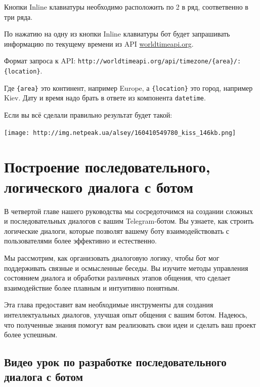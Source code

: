 \documentclass[
]{book}
\begin{document}
Кнопки Inline клавиатуры необходимо расположить по 2 в ряд, соответвенно в три ряда.

По нажатию на одну из кнопки Inline клавиатуры бот будет запрашивать информацию по текущему времени из API \href{http://worldtimeapi.org/}{worldtimeapi.org}.

Формат запроса к API: \texttt{http://worldtimeapi.org/api/timezone/\{area\}/:\{location\}}.

Где \texttt{\{area\}} это континент, например Europe, а \texttt{\{location\}} это город, например Kiev. Дату и время надо брать в ответе из компонента \texttt{datetime}.

Если вы всё сделали правильно результат будет такой:

\texttt{[image: http://img.netpeak.ua/alsey/160410549780\_kiss\_146kb.png]}

\chapter{Построение последовательного, логического диалога с ботом}\label{ux43fux43eux441ux442ux440ux43eux435ux43dux438ux435-ux43fux43eux441ux43bux435ux434ux43eux432ux430ux442ux435ux43bux44cux43dux43eux433ux43e-ux43bux43eux433ux438ux447ux435ux441ux43aux43eux433ux43e-ux434ux438ux430ux43bux43eux433ux430-ux441-ux431ux43eux442ux43eux43c}

В четвертой главе нашего руководства мы сосредоточимся на создании сложных и последовательных диалогов с вашим Telegram-ботом. Вы узнаете, как строить логические диалоги, которые позволят вашему боту взаимодействовать с пользователями более эффективно и естественно.

Мы рассмотрим, как организовать диалоговую логику, чтобы бот мог поддерживать связные и осмысленные беседы. Вы изучите методы управления состоянием диалога и обработки различных этапов общения, что сделает взаимодействие более плавным и интуитивно понятным.

Эта глава предоставит вам необходимые инструменты для создания интеллектуальных диалогов, улучшая опыт общения с вашим ботом. Надеюсь, что полученные знания помогут вам реализовать свои идеи и сделать ваш проект более успешным.

\section{Видео урок по разработке последовательного диалога с ботом}\label{ux432ux438ux434ux435ux43e-ux443ux440ux43eux43a-ux43fux43e-ux440ux430ux437ux440ux430ux431ux43eux442ux43aux435-ux43fux43eux441ux43bux435ux434ux43eux432ux430ux442ux435ux43bux44cux43dux43eux433ux43e-ux434ux438ux430ux43bux43eux433ux430-ux441-ux431ux43eux442ux43eux43c}
\end{document}

